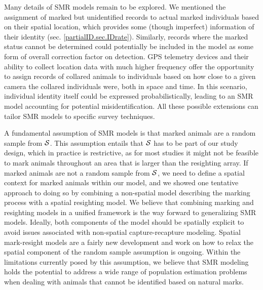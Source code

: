 Many details of SMR models remain to be explored. We mentioned the
assignment of marked but unidentified records to actual marked
individuals based on their spatial location, which provides some
(though imperfect) information of their identity
(sec. \ref{partialID.sec.IDrate}). Similarly, records where the marked
status cannot be determined could potentially be included in the model
as some form of overall correction factor on detection. GPS telemetry
devices and their ability to collect location data with much higher
frequency offer the opportunity to assign records of collared animals
to individuals based on how close to a given camera the collared
individuals were, both in space and time. In this scenario, individual
identity itself could be expressed probabilistically, leading to an
SMR model accounting for potential misidentification. All these
possible extensions can tailor SMR models to specific survey
techniques.

A fundamental assumption of SMR models is that marked animals are a
random sample from ${\cal
  S}$. %
This assumption entails that ${\cal S}$ has to be part of our study
design, which in practice is restrictive, as for most studies it might
not be feasible to mark animals throughout an area that is larger than
the resighting array. If marked animals are not a random sample from
${\cal S}$, we need to define a spatial context for marked animals
within our model, and we showed one tentative approach to doing so by
combining a non-spatial model describing the marking process with a
spatial resighting model. We believe that combining marking and
resighting models in a unified framework is the way forward to
generalizing SMR models. Ideally, both components of the model should
be spatially explicit to avoid issues associated with non-spatial
capture-recapture modeling. Spatial mark-resight models are a fairly
new development and work on how to relax the spatial component of the
random sample assumption is ongoing. Within the limitations currently
posed by this assumption, we believe that SMR modeling holds the
potential to address a wide range of population estimation problems
when dealing with animals that cannot be identified based on natural
marks.




